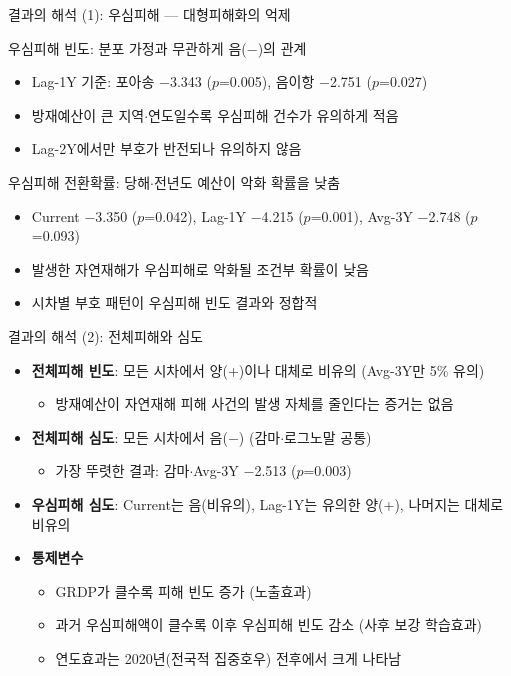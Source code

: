 \documentclass[aspectratio=169,10pt]{beamer}
\begin{document}
\begin{frame}{결과의 해석 (1): 우심피해 --- 대형피해화의 억제}
  \begin{block}{우심피해 빈도: 분포 가정과 무관하게 음($-$)의 관계}
    \small
    \begin{itemize}
      \item Lag-1Y 기준: 포아송 $-$3.343 ($p$=0.005), 음이항 $-$2.751 ($p$=0.027)
      \item 방재예산이 큰 지역$\cdot$연도일수록 우심피해 건수가 유의하게 적음
      \item Lag-2Y에서만 부호가 반전되나 유의하지 않음
    \end{itemize}
  \end{block}
  \begin{block}{우심피해 전환확률: 당해$\cdot$전년도 예산이 악화 확률을 낮춤}
    \small
    \begin{itemize}
      \item Current $-$3.350 ($p$=0.042), Lag-1Y $-$4.215 ($p$=0.001), Avg-3Y $-$2.748 ($p$=0.093)
      \item 발생한 자연재해가 우심피해로 \alert{악화될 조건부 확률}이 낮음
      \item 시차별 부호 패턴이 우심피해 빈도 결과와 정합적
    \end{itemize}
  \end{block}
\end{frame}

\begin{frame}{결과의 해석 (2): 전체피해와 심도}
  \begin{itemize}
    \item \textbf{전체피해 빈도}: 모든 시차에서 양(+)이나 대체로 비유의 (Avg-3Y만 5\% 유의)
    \begin{itemize}\small
      \item[$\Rightarrow$] 방재예산이 자연재해 피해 사건의 \alert{발생 자체}를 줄인다는 증거는 없음
    \end{itemize}
    \item \textbf{전체피해 심도}: 모든 시차에서 음($-$) (감마$\cdot$로그노말 공통)
    \begin{itemize}\small
      \item 가장 뚜렷한 결과: 감마$\cdot$Avg-3Y $-$2.513 ($p$=0.003)
    \end{itemize}
    \item \textbf{우심피해 심도}: Current는 음(비유의), Lag-1Y는 유의한 양(+), 나머지는 대체로 비유의
    \item \textbf{통제변수}
    \begin{itemize}\small
      \item GRDP가 클수록 피해 빈도 증가 (노출효과)
      \item 과거 우심피해액이 클수록 이후 우심피해 빈도 감소 (사후 보강 학습효과)
      \item 연도효과는 2020년(전국적 집중호우) 전후에서 크게 나타남
    \end{itemize}
  \end{itemize}
\end{frame}
\end{document}
